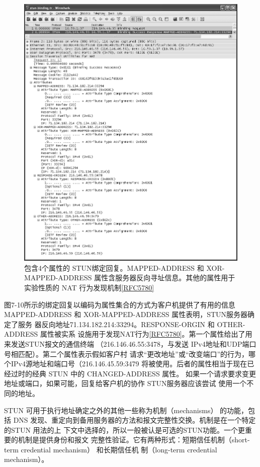 \begin{figure}[H]
  \centering
  \includegraphics[scale=0.5]{imgs/7/7-10.png}
  \caption{包含4个属性的 STUN绑定回复。MAPPED-ADDRESS 和 XOR-MAPPED-ADDRESS
    属性含服务器反向寻址信息。其他的属性用于实验性质的 NAT
  行为发现机制\href{https://www.rfc-editor.org/rfc/rfc5780}{[RFC5780]}}
\end{figure}

图7-10所示的绑定回复以编码为属性集合的方式为客户机提供了有用的信息
MAPPED-ADDRESS 和 XOR-MAPPED-ADDRESS 属性表明，STUN服务器确定了服务
器反向地址71.134.182.214:33294。RESPONSE-ORGIN 和 OTHER-ADDRESS 属性被实系
设施用于发现NAT行为\href{https://www.rfc-editor.org/rfc/rfc5780}{[RFC5780]}。第一个属性给出了用来发送STUN报文的通信终端
（216.146.46.55:3478，与发送 IPv4地址和UDP端口号相匹配）。第二个属性表示假如客户村
请求“更改地址”或“改变端口”的行为，哪个IPv4源地址和端口号（216.146.45.59:3479
将被使用。后者的属性相当于现在已经过时的经典 STUN 中的 CHANGED-ADDRESS 属性。
如果一个请求要求变更地址或端口，如果可能，回复给客户机的协作 STUN服务器应该尝试
使用一个不同的地址。

STUN 可用于执行地址确定之外的其他一些称为机制（mechanisms） 的功能，包括 DNS
发现、重定向到备用服务器的方法和报文完整性交换。机制是在一个特定的STUN 用法的上
下文中选择的，所以一般被认是可选的STUN功能。一个更重要的机制是提供身份和报文
完整性验证。它有两种形式：短期信任机制（short-term credential mechanism） 和长期信任机
制（long-term credential mechanism）。

